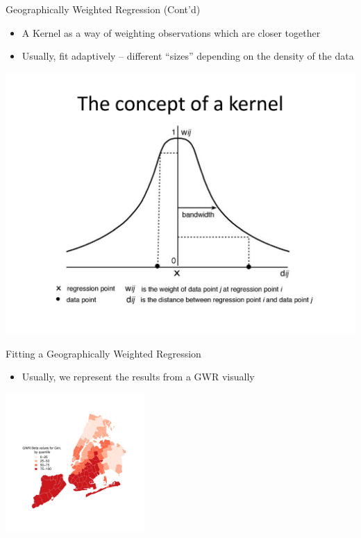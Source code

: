 \documentclass[aspectratio = 169, 12pt]{beamer}\usepackage[]{graphicx}\usepackage[]{color}
\newenvironment{knitrout}{}{} %
\begin{document}
\begin{frame}{Geographically Weighted Regression (Cont'd)}
\begin{itemize}
\item A Kernel as a way of weighting observations which are closer together
\item Usually, fit adaptively -- different ``sizes'' depending on the density of the data
\end{itemize}
\includegraphics[scale=0.15]{kernel_concept.jpg}
\end{frame}

\begin{frame}[fragile]{Fitting a Geographically Weighted Regression}
\begin{itemize}
\item Usually, we represent the results from a GWR visually
\end{itemize}
\begin{knitrout}
\color{fgcolor}
\includegraphics[width=200px]{figure/unnamed-chunk-18-1} 

\end{knitrout}
\end{frame}
\end{document}
